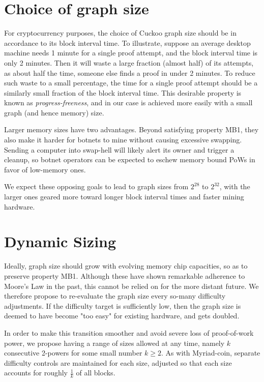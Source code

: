 \documentclass{beamer}
\begin{document}
\section{Choice of graph size}
For cryptocurrency purposes, the choice of Cuckoo graph size should be in accordance to its
block interval time.
To illustrate, suppose an average desktop machine needs 1 minute for a single proof attempt,
and the block interval time is only 2 minutes. Then it will waste a large fraction (almost half)
of its attempts, as about half the time, someone else finds a proof in under 2 minutes. To reduce such waste
to a small percentage, the time for a single proof attempt should be a similarly small fraction of the block
interval time. This desirable property is known as {\em progress-freeness}, and in our case
is achieved more easily with a small graph (and hence memory) size.

Larger memory sizes have two advantages. Beyond satisfying property MB1,
they also make it harder for botnets to mine without causing excessive swapping.
Sending a computer into swap-hell will likely alert its owner and trigger a cleanup,
so botnet operators can be expected to eschew memory bound PoWs in favor of low-memory ones.

We expect these opposing goals to lead to graph sizes from $2^{28}$ to $2^{32}$, with the larger ones geared
more toward longer block interval times and faster mining hardware.

\section{Dynamic Sizing}
Ideally, graph size should grow with evolving memory chip capacities, so as to preserve property MB1.
Although these have shown remarkable adherence to Moore's Law in the past,
this cannot be relied on for the more distant future.
We therefore propose to re-evaluate the graph size every so-many difficulty adjustments.
If the difficulty target is sufficiently low, then the
graph size is deemed to have become "too easy" for existing hardware, and gets doubled.

In order to make this transition smoother and avoid severe loss of proof-of-work power,
we propose having a range of sizes allowed at any time,
namely $k$ consecutive 2-powers for some small number $k\geq 2$.
As with Myriad-coin, separate difficulty controls are maintained for each size,
adjusted so that each size accounts for roughly $\frac{1}{k}$ of all blocks.
\end{document}
